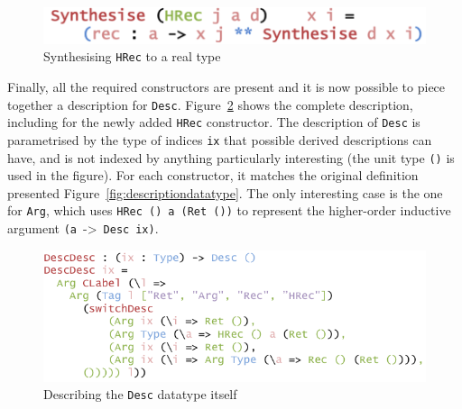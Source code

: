 \documentclass{ituthesis}
\newcommand{\ttconstructor}[1]{\textcolor{constructor-color}{\texttt{#1}}}
\newcommand{\tttype}[1]{\textcolor{type-color}{\texttt{#1}}}
\newcommand{\ttvar}[1]{\textcolor{local-var-color}{\texttt{#1}}}
\begin{document}
\begin{figure}[ht]
\begin{center}
    \includegraphics[scale=0.5]{Figures/SynthesisingDataExtended.png}
\end{center}
\caption{Synthesising \ttconstructor{HRec} to a real type}
\label{fig:synthhrec}
\end{figure}

Finally, all the required constructors are present and it is now possible to piece together a description for \tttype{Desc}. Figure~\ref{fig:descdesc} shows the complete description, including for the newly added
\ttconstructor{HRec} constructor. The description of \tttype{Desc} is parametrised by the type of indices \ttvar{ix} that possible derived descriptions can have, and is not indexed by anything particularly interesting (the unit type \tttype{()} is used in the figure).
For each constructor, it matches the original definition presented Figure~\ref{fig:descriptiondatatype}. The only interesting case is the one for \ttconstructor{Arg}, which uses \ttconstructor{HRec ()}~\ttvar{a}~\texttt{(}\ttconstructor{Ret ()}\texttt{)} to represent the higher-order inductive argument \texttt{(}\ttvar{a}~->~\tttype{Desc}~\ttvar{ix}\texttt{)}.

\begin{figure}[ht]
\begin{center}
    \includegraphics[scale=0.5]{Figures/DescriptionDescription.png}
\end{center}
\caption{Describing the \tttype{Desc} datatype itself}
\label{fig:descdesc}
\end{figure}
\end{document}
